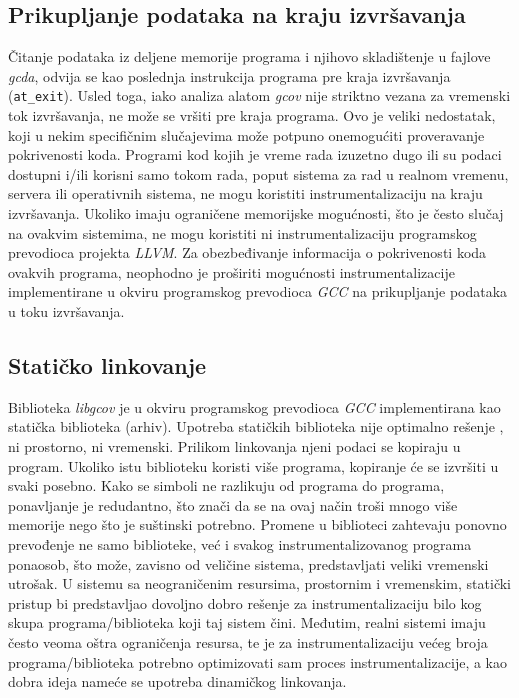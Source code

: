 \documentclass[12pt,oneside]{memoir}
\newcommand{\kod}[1]{\texttt{#1}}
\newcommand{\strano}[1]{\textit{#1}}
\begin{document}
\subsection{Prikupljanje podataka na kraju izvršavanja}


Čitanje podataka iz deljene memorije programa i njihovo skladištenje u fajlove \strano{gcda}, odvija se kao poslednja instrukcija programa pre kraja izvršavanja (\kod{at\_exit}). Usled toga, iako analiza alatom \strano{gcov} nije striktno vezana za vremenski tok izvršavanja, ne može se vršiti pre kraja programa. Ovo je veliki nedostatak, koji u nekim specifičnim slučajevima može potpuno onemogućiti proveravanje pokrivenosti koda. Programi kod kojih je vreme rada izuzetno dugo ili su podaci dostupni i/ili korisni samo tokom rada, poput sistema za rad u realnom vremenu, servera ili operativnih sistema, ne mogu koristiti instrumentalizaciju na kraju izvršavanja. Ukoliko imaju ograničene memorijske mogućnosti, što je često slučaj na ovakvim sistemima, ne mogu koristiti ni instrumentalizaciju programskog prevodioca projekta \strano{LLVM}. Za obezbeđivanje informacija o pokrivenosti koda ovakvih programa, neophodno je proširiti mogućnosti instrumentalizacije implementirane u okviru programskog prevodioca \strano{GCC} na prikupljanje podataka u toku izvršavanja.


\subsection{Statičko linkovanje}


Biblioteka \strano{libgcov} je u okviru programskog prevodioca \strano{GCC} implementirana kao statička biblioteka (arhiv). Upotreba statičkih biblioteka nije optimalno rešenje \cite{staVSdinLINK}, ni prostorno, ni vremenski. Prilikom linkovanja njeni podaci se kopiraju u program. Ukoliko istu biblioteku koristi više programa, kopiranje će se izvršiti u svaki posebno. Kako se simboli ne razlikuju od programa do programa, ponavljanje je redudantno, što znači da se na ovaj način troši mnogo više memorije nego što je suštinski potrebno. Promene u biblioteci zahtevaju ponovno prevođenje ne samo biblioteke, već i svakog instrumentalizovanog programa ponaosob, što može, zavisno od veličine sistema, predstavljati veliki vremenski utrošak. U sistemu sa neograničenim resursima, prostornim i vremenskim, statički pristup bi predstavljao dovoljno dobro rešenje za instrumentalizaciju bilo kog skupa programa/biblioteka koji taj sistem čini. Međutim, realni sistemi imaju često veoma oštra ograničenja resursa, te je za instrumentalizaciju većeg broja programa/biblioteka potrebno optimizovati sam proces instrumentalizacije, a kao dobra ideja nameće se upotreba dinamičkog linkovanja.
\end{document}
